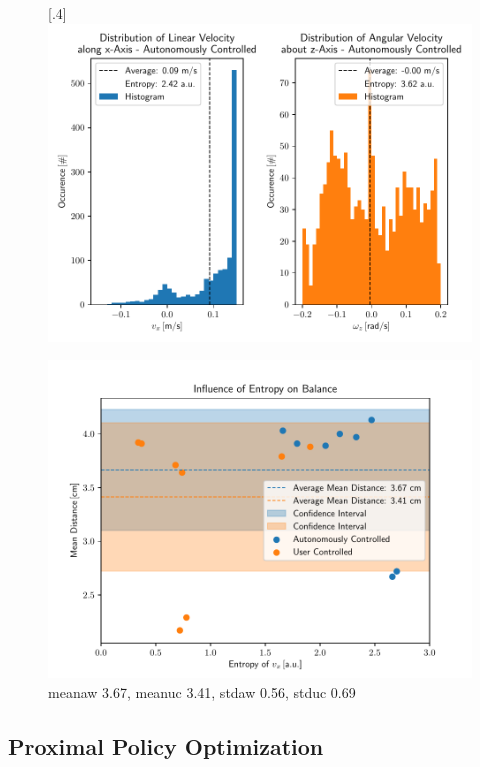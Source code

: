 \begin{figure}[h]
	[.4\linewidth]{\includegraphics[scale=.35]{chapters/05_experiments/04_autonomous_walking/semantic_walk_01_entropy.pdf}}
	\caption{}
	\label{fig::53_aw_additional}
\end{figure}
\begin{figure}[h]
	\centering
	\includegraphics[scale=.6]{chapters/05_experiments/04_autonomous_walking/entropy_against_balance.pdf}
	\caption{meanaw 3.67, meanuc 3.41, stdaw 0.56, stduc 0.69}
	\label{fig::542_entropy_balance}
\end{figure}
\subsection{Proximal Policy Optimization}
